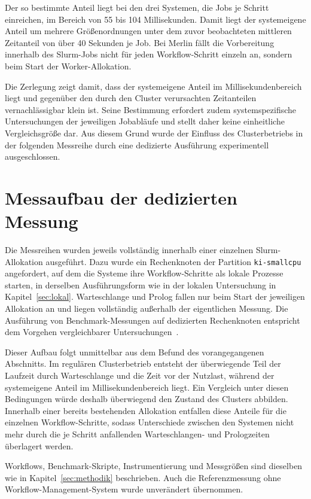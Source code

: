 Der so bestimmte Anteil liegt bei den drei Systemen, die Jobs je
Schritt einreichen, im Bereich von 55 bis 104 Millisekunden. Damit liegt der systemeigene Anteil um mehrere Größenordnungen unter dem zuvor beobachteten mittleren Zeitanteil von über 40 Sekunden je Job. Bei Merlin fällt die Vorbereitung innerhalb des Slurm-Jobs nicht für jeden Workflow-Schritt einzeln an, sondern beim Start der Worker-Allokation.


Die Zerlegung zeigt damit, dass der systemeigene Anteil im
Millisekundenbereich liegt und gegenüber den durch den Cluster
verursachten Zeitanteilen vernachlässigbar klein ist. Seine
Bestimmung erfordert zudem systemspezifische Untersuchungen der
jeweiligen Jobabläufe und stellt daher keine einheitliche
Vergleichsgröße dar. Aus diesem Grund wurde der Einfluss des
Clusterbetriebs in der folgenden Messreihe durch eine dedizierte Ausführung experimentell ausgeschlossen.



\section{Messaufbau der dedizierten Messung}
\label{sec:mogon:dediziert}

Die Messreihen wurden jeweils vollständig innerhalb einer einzelnen
Slurm-Allokation ausgeführt. Dazu wurde ein Rechenknoten der
Partition \texttt{ki-smallcpu} angefordert, auf dem die Systeme
ihre Workflow-Schritte als lokale Prozesse starten, in derselben
Ausführungsform wie in der lokalen Untersuchung in
Kapitel~\ref{sec:lokal}. Warteschlange und Prolog fallen nur beim
Start der jeweiligen Allokation an und liegen vollständig außerhalb
der eigentlichen Messung. Die Ausführung von Benchmark-Messungen
auf dedizierten Rechenknoten entspricht dem Vorgehen vergleichbarer
Untersuchungen~\cite[S.~103]{wfbench2022}.

Dieser Aufbau folgt unmittelbar aus dem Befund des vorangegangenen
Abschnitts. Im regulären Clusterbetrieb entsteht der überwiegende
Teil der Laufzeit durch Warteschlange und die Zeit vor der
Nutzlast, während der systemeigene Anteil im Millisekundenbereich
liegt. Ein Vergleich unter diesen Bedingungen würde deshalb
überwiegend den Zustand des Clusters abbilden. Innerhalb einer
bereits bestehenden Allokation entfallen diese Anteile für die
einzelnen Workflow-Schritte, sodass Unterschiede zwischen den
Systemen nicht mehr durch die je Schritt anfallenden
Warteschlangen- und Prologzeiten überlagert werden.

Workflows, Benchmark-Skripte, Instrumentierung und Messgrößen sind
dieselben wie in Kapitel~\ref{sec:methodik} beschrieben. Auch die
Referenzmessung ohne Workflow-Management-System wurde unverändert
übernommen.

